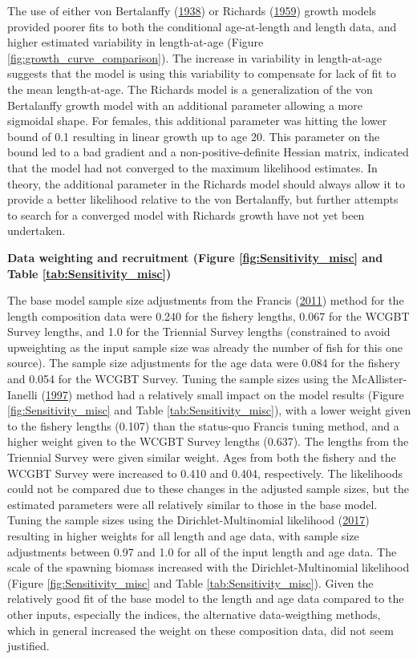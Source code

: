 \documentclass[12pt,]{article}
\begin{document}
The use of either von Bertalanffy (\protect\hyperlink{ref-VonB}{1938})
or Richards (\protect\hyperlink{ref-richards1959flexible}{1959}) growth
models provided poorer fits to both the conditional age-at-length and
length data, and higher estimated variability in length-at-age (Figure
\ref{fig:growth_curve_comparison}). The increase in variability in
length-at-age suggests that the model is using this variability to
compensate for lack of fit to the mean length-at-age. The Richards model
is a generalization of the von Bertalanffy growth model with an
additional parameter allowing a more sigmoidal shape. For females, this
additional parameter was hitting the lower bound of 0.1 resulting in
linear growth up to age 20. This parameter on the bound led to a bad
gradient and a non-positive-definite Hessian matrix, indicated that the
model had not converged to the maximum likelihood estimates. In theory,
the additional parameter in the Richards model should always allow it to
provide a better likelihood relative to the von Bertalanffy, but further
attempts to search for a converged model with Richards growth have not
yet been undertaken.

\textbf{Data weighting and recruitment (Figure
\ref{fig:Sensitivity_misc} and Table \ref{tab:Sensitivity_misc})}

The base model sample size adjustments from the Francis
(\protect\hyperlink{ref-Francis2011}{2011}) method for the length
composition data were 0.240 for the fishery lengths, 0.067 for the WCGBT
Survey lengths, and 1.0 for the Triennial Survey lengths (constrained to
avoid upweighting as the input sample size was already the number of
fish for this one source). The sample size adjustments for the age data
were 0.084 for the fishery and 0.054 for the WCGBT Survey. Tuning the
sample sizes using the McAllister-Ianelli
(\protect\hyperlink{ref-McAllister1997}{1997}) method had a relatively
small impact on the model results (Figure \ref{fig:Sensitivity_misc} and
Table \ref{tab:Sensitivity_misc}), with a lower weight given to the
fishery lengths (0.107) than the status-quo Francis tuning method, and a
higher weight given to the WCGBT Survey lengths (0.637). The lengths
from the Triennial Survey were given similar weight. Ages from both the
fishery and the WCGBT Survey were increased to 0.410 and 0.404,
respectively. The likelihoods could not be compared due to these changes
in the adjusted sample sizes, but the estimated parameters were all
relatively similar to those in the base model. Tuning the sample sizes
using the Dirichlet-Multinomial likelihood
(\protect\hyperlink{ref-Thorson2017c}{2017}) resulting in higher weights
for all length and age data, with sample size adjustments between 0.97
and 1.0 for all of the input length and age data. The scale of the
spawning biomass increased with the Dirichlet-Multinomial likelihood
(Figure \ref{fig:Sensitivity_misc} and Table
\ref{tab:Sensitivity_misc}). Given the relatively good fit of the base
model to the length and age data compared to the other inputs,
especially the indices, the alternative data-weigthing methods, which in
general increased the weight on these composition data, did not seem
justified.
\end{document}
